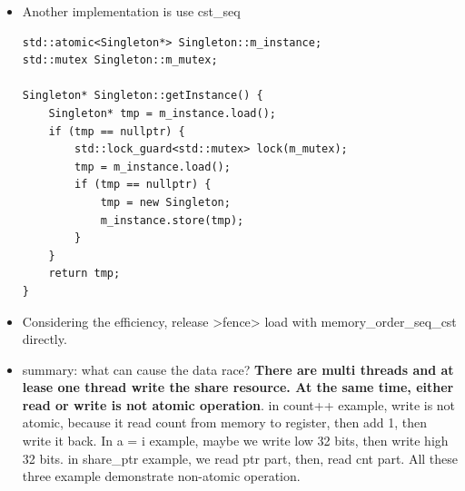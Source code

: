 \documentclass[a4paper,11pt,twoside]{book}
\begin{document}
\begin{itemize}
    \item Another implementation is use cst\_seq
\begin{lstlisting}[]
std::atomic<Singleton*> Singleton::m_instance;
std::mutex Singleton::m_mutex;

Singleton* Singleton::getInstance() {
    Singleton* tmp = m_instance.load();
    if (tmp == nullptr) {
        std::lock_guard<std::mutex> lock(m_mutex);
        tmp = m_instance.load();
        if (tmp == nullptr) {
            tmp = new Singleton;
            m_instance.store(tmp);
        }
    }
    return tmp;
}
\end{lstlisting}

    \item Considering the efficiency, release >fence> load with memory\_order\_seq\_cst directly.

    \item summary: what can cause the data race? \textbf{There are multi threads and at lease one thread write the share resource. At the same time,  either read or write is not atomic operation}. in count++ example, write is not atomic, because it read count from memory to register, then add 1, then write it back. In a = i example, maybe we write low 32 bits, then write high 32 bits. in share\_ptr example, we read ptr part, then, read cnt part. All these three example demonstrate non-atomic operation.  
        
\end{itemize}
\end{document}
